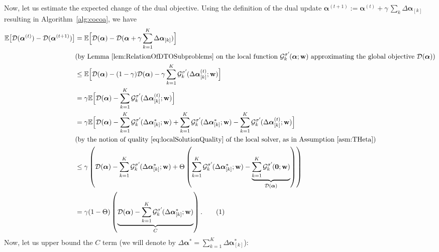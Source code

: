 \documentclass{article}
\newcommand{\Exp}{\mathbb{E}}                      %
\newcommand\tagthis{\addtocounter{equation}{1}\tag{\theequation}}
\newcommand{\wv}{ {\bf w}}
\newcommand{\alphav}{ {\boldsymbol \alpha}}
\newcommand{\0}{ {\bf 0}}
\newcommand{\vsubset}[2]{#1_{[#2]}}
\newcommand{\vc}[2]{#1^{(#2)}}                   %
\newcommand{\bD}{\mathcal{D}}
\newcommand{\Ggk}{\mathcal{G}^{\sigma'}_k\hspace{-0.08em}}
\theoremstyle{plain}
\theoremstyle{definition}
\begin{document}
Now, let us estimate the expected change of the dual objective. 
Using the definition of the dual update $\vc{\alphav}{t+1} := \vc{\alphav}{t} + \gamma \, \sum_k \vsubset{\Delta \alphav}{k}$ resulting in Algorithm~\ref{alg:cocoa}, we have
\begin{align*}
\Exp\big[\bD(\vc{\alphav}{t})
 - \bD(\vc{\alphav}{t+1})\big]
& =
\Exp\Big[\bD(\alphav)
 - \bD(\alphav +
  \gamma \sum_{k=1}^K
  \vsubset{\Delta \alphav}{k})\Big]
\\
& \text{(by Lemma \ref{lem:RelationOfDTOSubproblems} on the local function $\Ggk(\alphav;\wv)$ approximating the global objective $\bD(\alphav)$)}\\
&\leq
\Exp\Big[\bD(\alphav)
-(1-\gamma)\bD(\alphav)
-\gamma 
 \sum_{k=1}^K 
 \Ggk (\vsubset{
 \vc{\Delta \alphav}{t}}{k}; \wv)
\Big]\\
&=
\gamma
\Exp\Big[
 \bD(\alphav)
- 
 \sum_{k=1}^K 
 \Ggk (\vsubset{
 \vc{\Delta \alphav}{t}}{k}; \wv)
\Big]
\\
&
=
\gamma
\Exp\Big[
 \bD(\alphav)
 -
 \sum_{k=1}^K 
 \Ggk(\vsubset{\Delta \alphav^*}{k};\wv)
 +
 \sum_{k=1}^K 
 \Ggk(\vsubset{\Delta \alphav^*}{k};\wv)
- 
 \sum_{k=1}^K 
 \Ggk (\vsubset{
 \vc{\Delta \alphav}{t}}{k}; \wv)
\Big]
\\
&\text{(by the notion of quality \eqref{eq:localSolutionQuality} of the local solver, as in Assumption \ref{asm:THeta})}\\
&\leq
\gamma
\left(
 \bD(\alphav)
 -
 \sum_{k=1}^K 
 \Ggk(\vsubset{\Delta \alphav^*}{k};\wv)
 +
 \Theta
 \left(
 \sum_{k=1}^K  
 \Ggk(\vsubset{\Delta \alphav^*}{k};\wv)
 -
\underbrace{  \sum_{k=1}^K  
 \Ggk({\bf 0};\wv)
 }_{\bD(\alphav)}
 \right)
\right)
\\
&=
\gamma
(1-\Theta)
\left(
\underbrace{
 \bD(\alphav)
 -
 \sum_{k=1}^K 
 \Ggk(\vsubset{\Delta \alphav^*}{k};\wv)
 }_{C}
\right).
\tagthis
\label{eq:Afasfwafewaef}
\end{align*} 
Now, let us upper bound 
the $C$ term 
(we will denote by
$\Delta \alphav^* 
 = \sum_{k=1}^K \vsubset{\Delta \alphav^*}{k}$):
\end{document}

